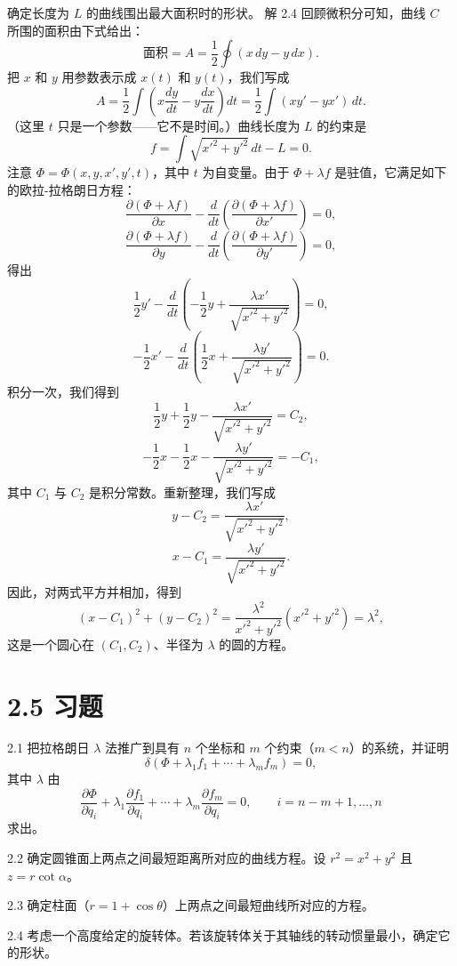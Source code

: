 \begin{example}
确定长度为 $L$ 的曲线围出最大面积时的形状。
解 2.4 回顾微积分可知，曲线 $C$ 所围的面积由下式给出：
$$
\text{面积} = A = \frac{1}{2}\oint(x\, dy - y\, dx).
$$
把 $x$ 和 $y$ 用参数表示成 $x(t)$ 和 $y(t)$，我们写成
$$
A = \frac{1}{2}\int\left(x\frac{dy}{dt} - y\frac{dx}{dt}\right)dt
= \frac{1}{2}\int (xy' - yx')\, dt.
$$
（这里 $t$ 只是一个参数——它不是时间。）曲线长度为 $L$ 的约束是
$$
f = \int \sqrt{x'^2 + y'^2}\, dt - L = 0.
$$
注意 $\Phi = \Phi(x, y, x', y', t)$，其中 $t$ 为自变量。由于 $\Phi + \lambda f$ 是驻值，它满足如下的欧拉-拉格朗日方程：
$$
\frac{\partial(\Phi + \lambda f)}{\partial x}
- \frac{d}{dt}\left(\frac{\partial(\Phi + \lambda f)}{\partial x'}\right) = 0,
$$
$$
\frac{\partial(\Phi + \lambda f)}{\partial y}
- \frac{d}{dt}\left(\frac{\partial(\Phi + \lambda f)}{\partial y'}\right) = 0,
$$
得出
$$
\frac{1}{2}y' - \frac{d}{dt}\left(-\frac{1}{2}y + \frac{\lambda x'}{\sqrt{x'^2 + y'^2}}\right) = 0,
$$
$$
-\frac{1}{2}x' - \frac{d}{dt}\left(\frac{1}{2}x + \frac{\lambda y'}{\sqrt{x'^2 + y'^2}}\right) = 0.
$$
积分一次，我们得到
$$
\frac{1}{2}y + \frac{1}{2}y - \frac{\lambda x'}{\sqrt{x'^2 + y'^2}} = C_2,
$$
$$
-\frac{1}{2}x - \frac{1}{2}x - \frac{\lambda y'}{\sqrt{x'^2 + y'^2}} = -C_1,
$$
其中 $C_1$ 与 $C_2$ 是积分常数。重新整理，我们写成
$$
y - C_2 = \frac{\lambda x'}{\sqrt{x'^2 + y'^2}},
$$
$$
x - C_1 = \frac{\lambda y'}{\sqrt{x'^2 + y'^2}}.
$$
因此，对两式平方并相加，得到
$$
(x - C_1)^2 + (y - C_2)^2
= \frac{\lambda^2}{x'^2 + y'^2}(x'^2 + y'^2) = \lambda^2,
$$
这是一个圆心在 $(C_1, C_2)$、半径为 $\lambda$ 的圆的方程。
\end{example}

\section*{2.5  习题}

2.1 把拉格朗日 $\lambda$ 法推广到具有 $n$ 个坐标和 $m$ 个约束（$m < n$）的系统，并证明
$$
\delta(\Phi + \lambda_1 f_1 + \cdots + \lambda_m f_m) = 0,
$$
其中 $\lambda$ 由
$$
\frac{\partial\Phi}{\partial q_i} + \lambda_1\frac{\partial f_1}{\partial q_i}
+ \cdots + \lambda_m\frac{\partial f_m}{\partial q_i} = 0,
\qquad i = n - m + 1, \ldots, n
$$
求出。

2.2 确定圆锥面上两点之间最短距离所对应的曲线方程。设 $r^2 = x^2 + y^2$ 且 $z = r\cot\alpha$。

2.3 确定柱面（$r = 1 + \cos\theta$）上两点之间最短曲线所对应的方程。

2.4 考虑一个高度给定的旋转体。若该旋转体关于其轴线的转动惯量最小，确定它的形状。

